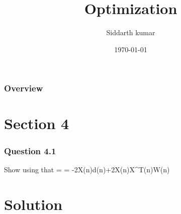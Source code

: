 \documentclass{beamer}
\title[Short title]{Optimization } %
\author{Siddarth kumar} %
\institute[IITH] %
{
IIT Hyderabad \\ %
\medskip
\text{EE15BTECH11032} %
}
\date{\today} %
\begin{document}
\begin{frame}
\titlepage %
\end{frame}

\begin{frame}
\frametitle{Overview} %
\tableofcontents %
\end{frame}


\section{Section 4} %


\begin{frame}
\frametitle{Question 4.1}
Show using  that \bigbreak
{} =  = -2X(n)d(n)+2X(n)X^T(n)W(n)


\end{frame}

\section{Solution}
\end{document}
